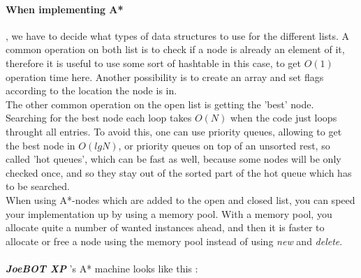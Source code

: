 \documentclass[12pt]{article}
\newcommand {\joebotxp}{\textit{\textbf{JoeBOT XP}} }
\begin{document}
\paragraph{When implementing A*}, we have to decide what types of data structures to use for the different lists. A common operation on both list is to check if a node is already an element of it, therefore it is useful to use some sort of hashtable in this case, to get \(O(1)\) operation time here. Another possibility is to create an array and set flags according to the location the node is in.\\
The other common operation on the open list is getting the 'best' node. Searching for the best node each loop takes \(O(N)\) when the code just loops throught all entries. To avoid this, one can use priority queues, allowing to get the best node in \(O(lg N)\), or priority queues on top of an unsorted rest, so called 'hot queues', which can be fast as well, because some nodes will be only checked once, and so they stay out of the sorted part of the hot queue which has to be searched.\\
When using A*-nodes which are added to the open and closed list, you can speed your implementation up by using a memory pool. With a memory pool, you allocate quite a number of wanted instances ahead, and then it is faster to allocate or free a node using the memory pool instead of using \textit{new} and \textit{delete}.
\paragraph{} \joebotxp 's A* machine looks like this :
\end{document}
